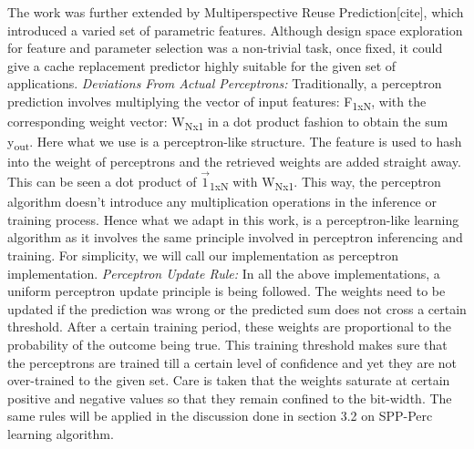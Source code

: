 \documentclass{sig-alternate}
\begin{document}
The work was further extended by Multiperspective Reuse Prediction[cite], which introduced a varied set of parametric features. Although design space exploration for feature and parameter selection was a non-trivial task, once fixed, it could give a cache replacement predictor highly suitable for the given set of applications.
\newline
\newline
\textit{Deviations From Actual Perceptrons:} Traditionally, a perceptron prediction involves multiplying the vector of input features: F\textsubscript{1xN}, with the corresponding weight vector: W\textsubscript{Nx1} in a dot product fashion to obtain the sum y\textsubscript{out}. Here what we use is a perceptron-like structure. The feature is used to hash into the weight of perceptrons and the retrieved weights are added straight away. This can be seen a dot product of $\vec{1}$\textsubscript{1xN} with W\textsubscript{Nx1}. This way, the perceptron algorithm doesn't introduce any multiplication operations in the inference or training process. Hence what we adapt in this work, is a perceptron-like learning algorithm as it involves the same principle involved in perceptron inferencing and training. For simplicity, we will call our implementation as perceptron implementation.
\newline
\newline
\textit{Perceptron Update Rule:} In all the above implementations, a uniform perceptron update principle is being followed. The weights need to be updated if the prediction was wrong or the predicted sum does not cross a certain threshold. After a certain training period, these weights are proportional to the probability of the outcome being true. This training threshold makes sure that the perceptrons are trained till a certain level of confidence and yet they are not over-trained to the given set. Care is taken that the weights saturate at certain positive and negative values so that they remain confined to the bit-width. The same rules will be applied in the discussion done in section 3.2 on SPP-Perc learning algorithm.
\end{document}
